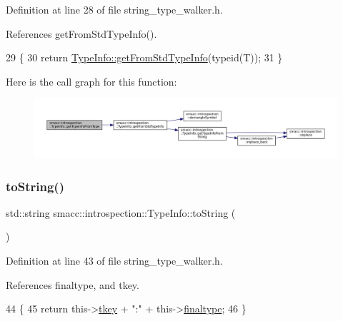 Definition at line 28 of file string\+\_\+type\+\_\+walker.\+h.



References get\+From\+Std\+Type\+Info().


\begin{DoxyCode}
29     \{
30         \textcolor{keywordflow}{return} \hyperlink{classsmacc_1_1introspection_1_1TypeInfo_ada1e604cd8bf968a5f816fbace4af881}{TypeInfo::getFromStdTypeInfo}(\textcolor{keyword}{typeid}(T));
31     \}
\end{DoxyCode}
Here is the call graph for this function\+:
\nopagebreak
\begin{figure}[H]
\begin{center}
\leavevmode
\includegraphics[width=350pt]{classsmacc_1_1introspection_1_1TypeInfo_a8716ca6ac890b4582986d9fe4f5962ad_cgraph}
\end{center}
\end{figure}
\mbox{\label{classsmacc_1_1introspection_1_1TypeInfo_a41eb6c64f46a8e24a206e5702c6f6818}} 
\subsubsection{\texorpdfstring{to\+String()}{toString()}}
{\footnotesize\ttfamily std\+::string smacc\+::introspection\+::\+Type\+Info\+::to\+String (\begin{DoxyParamCaption}{ }\end{DoxyParamCaption})\hspace{0.3cm}{\ttfamily [inline]}}



Definition at line 43 of file string\+\_\+type\+\_\+walker.\+h.



References finaltype, and tkey.


\begin{DoxyCode}
44     \{
45         \textcolor{keywordflow}{return} this->\hyperlink{classsmacc_1_1introspection_1_1TypeInfo_a697dd505119258dba1224d10eea5b2bd}{tkey} + \textcolor{stringliteral}{":"} + this->\hyperlink{classsmacc_1_1introspection_1_1TypeInfo_aa4010ed427e12db443e08ab16a3de243}{finaltype};
46     \}
\end{DoxyCode}


